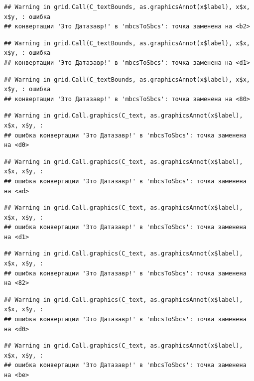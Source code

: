 \documentclass[]{book}
\begin{document}
\begin{verbatim}
## Warning in grid.Call(C_textBounds, as.graphicsAnnot(x$label), x$x, x$y, : ошибка
## конвертации 'Это Датазавр!' в 'mbcsToSbcs': точка заменена на <b2>
\end{verbatim}

\begin{verbatim}
## Warning in grid.Call(C_textBounds, as.graphicsAnnot(x$label), x$x, x$y, : ошибка
## конвертации 'Это Датазавр!' в 'mbcsToSbcs': точка заменена на <d1>
\end{verbatim}

\begin{verbatim}
## Warning in grid.Call(C_textBounds, as.graphicsAnnot(x$label), x$x, x$y, : ошибка
## конвертации 'Это Датазавр!' в 'mbcsToSbcs': точка заменена на <80>
\end{verbatim}

\begin{verbatim}
## Warning in grid.Call.graphics(C_text, as.graphicsAnnot(x$label), x$x, x$y, :
## ошибка конвертации 'Это Датазавр!' в 'mbcsToSbcs': точка заменена на <d0>
\end{verbatim}

\begin{verbatim}
## Warning in grid.Call.graphics(C_text, as.graphicsAnnot(x$label), x$x, x$y, :
## ошибка конвертации 'Это Датазавр!' в 'mbcsToSbcs': точка заменена на <ad>
\end{verbatim}

\begin{verbatim}
## Warning in grid.Call.graphics(C_text, as.graphicsAnnot(x$label), x$x, x$y, :
## ошибка конвертации 'Это Датазавр!' в 'mbcsToSbcs': точка заменена на <d1>
\end{verbatim}

\begin{verbatim}
## Warning in grid.Call.graphics(C_text, as.graphicsAnnot(x$label), x$x, x$y, :
## ошибка конвертации 'Это Датазавр!' в 'mbcsToSbcs': точка заменена на <82>
\end{verbatim}

\begin{verbatim}
## Warning in grid.Call.graphics(C_text, as.graphicsAnnot(x$label), x$x, x$y, :
## ошибка конвертации 'Это Датазавр!' в 'mbcsToSbcs': точка заменена на <d0>
\end{verbatim}

\begin{verbatim}
## Warning in grid.Call.graphics(C_text, as.graphicsAnnot(x$label), x$x, x$y, :
## ошибка конвертации 'Это Датазавр!' в 'mbcsToSbcs': точка заменена на <be>
\end{verbatim}
\end{document}
